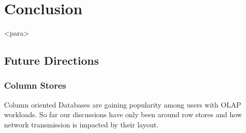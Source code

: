 
\chapter{Conclusion}
<para>
\section{Future Directions}
\subsection{Column Stores}
Column oriented Databases are gaining popularity among users with OLAP workloads. 
So far our discussions have only been around row stores and how network transmission 
is impacted by their layout. 